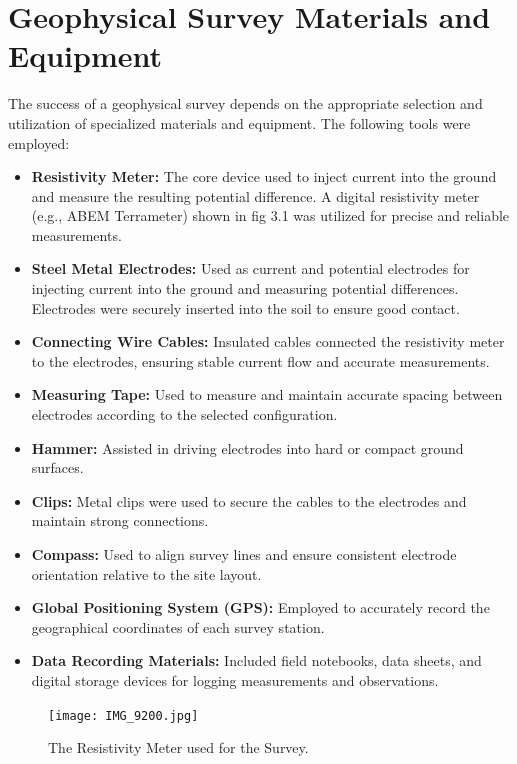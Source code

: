 \documentclass[12pt,a4paper]{report}
\begin{document}
\section{Geophysical Survey Materials and Equipment}
The success of a geophysical survey depends on the appropriate selection and utilization of specialized materials and equipment. The following tools were employed:

\begin{itemize}
    \item \textbf{Resistivity Meter:} The core device used to inject current into the ground and measure the resulting potential difference. A digital resistivity meter (e.g., ABEM Terrameter) shown in fig 3.1 was utilized for precise and reliable measurements.
    \item \textbf{Steel Metal Electrodes:} Used as current and potential electrodes for injecting current into the ground and measuring potential differences. Electrodes were securely inserted into the soil to ensure good contact.
    \item \textbf{Connecting Wire Cables:} Insulated cables connected the resistivity meter to the electrodes, ensuring stable current flow and accurate measurements.
    \item \textbf{Measuring Tape:} Used to measure and maintain accurate spacing between electrodes according to the selected configuration.
    \item \textbf{Hammer:} Assisted in driving electrodes into hard or compact ground surfaces.
    \item \textbf{Clips:} Metal clips were used to secure the cables to the electrodes and maintain strong connections.
    \item \textbf{Compass:} Used to align survey lines and ensure consistent electrode orientation relative to the site layout.
    \item \textbf{Global Positioning System (GPS):} Employed to accurately record the geographical coordinates of each survey station.
    \item \textbf{Data Recording Materials:} Included field notebooks, data sheets, and digital storage devices for logging measurements and observations.
\end{itemize}
    
\begin{figure}[h]
    \centering
    \texttt{[image: IMG\_9200.jpg]}
    \caption{The Resistivity Meter used for the Survey.}
\end{figure}
\end{document}
